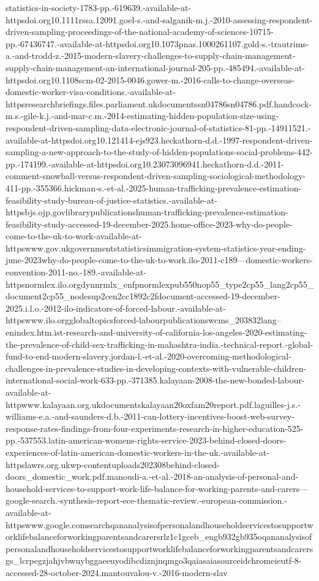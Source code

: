 \documentclass[
  12pt,
  letterpaper,
  DIV=11,
  numbers=noendperiod]{scrartcl}
\begin{document}
{{statistics-in-society-1783-pp.-619639.-available-at-httpsdoi.org10.1111rssa.12091.goel-s.-and-salganik-m.j.-2010-assessing-respondent-driven-sampling-proceedings-of-the-national-academy-of-sciences-10715-pp.-67436747.-available-at-httpsdoi.org10.1073pnas.1000261107.gold-s.-trautrims-a.-and-trodd-z.-2015-modern-slavery-challenges-to-supply-chain-management-supply-chain-management-an-international-journal-205-pp.-485494.-available-at-httpsdoi.org10.1108scm-02-2015-0046.gower-m.-2016-calls-to-change-overseas-domestic-worker-visa-conditions.-available-at-httpsresearchbriefings.files.parliament.ukdocumentssn04786sn04786.pdf.handcock-m.s.-gile-k.j.-and-mar-c.m.-2014-estimating-hidden-population-size-using-respondent-driven-sampling-data-electronic-journal-of-statistics-81-pp.-14911521.-available-at-httpsdoi.org10.121414-ejs923.heckathorn-d.d.-1997-respondent-driven-sampling-a-new-approach-to-the-study-of-hidden-populations-social-problems-442-pp.-174199.-available-at-httpsdoi.org10.23073096941.heckathorn-d.d.-2011-comment-snowball-versus-respondent-driven-sampling-sociological-methodology-411-pp.-355366.hickman-s.-et-al.-2025-human-trafficking-prevalence-estimation-feasibility-study-bureau-of-justice-statistics.-available-at-httpsbjs.ojp.govlibrarypublicationshuman-trafficking-prevalence-estimation-feasibility-study-accessed-19-december-2025.home-office-2023-why-do-people-come-to-the-uk-to-work-available-at-httpswww.gov.ukgovernmentstatisticsimmigration-system-statistics-year-ending-june-2023why-do-people-come-to-the-uk-to-work.ilo-2011-c189---domestic-workers-convention-2011-no.-189.-available-at-httpsnormlex.ilo.orgdynnrmlx_enfpnormlexpub550nop55_type2cp55_lang2cp55_document2cp55_nodesup2cen2cc1892c2fdocument-accessed-19-december-2025.i.l.o.-2012-ilo-indicators-of-forced-labour.-available-at-httpswww.ilo.orgglobaltopicsforced-labourpublicationswcms_203832lang--enindex.htm.ist-research-and-university-of-california-los-angeles-2020-estimating-the-prevalence-of-child-sex-trafficking-in-mahashtra-india.-technical-report.-global-fund-to-end-modern-slavery.jordan-l.-et-al.-2020-overcoming-methodological-challenges-in-prevalence-studies-in-developing-contexts-with-vulnerable-children-international-social-work-633-pp.-371385.kalayaan-2008-the-new-bonded-labour-available-at-httpwww.kalayaan.org.ukdocumentskalayaan20oxfam20report.pdf.laguilles-j.s.-williams-e.a.-and-saunders-d.b.-2011-can-lottery-incentives-boost-web-survey-response-rates-findings-from-four-experiments-research-in-higher-education-525-pp.-537553.latin-american-womens-rights-service-2023-behind-closed-doors-experiences-of-latin-american-domestic-workers-in-the-uk.-available-at-httpslawrs.org.ukwp-contentuploads202308behind-closed-doors_domestic_work.pdf.manoudi-a.-et-al.-2018-an-analysis-of-personal-and-household-services-to-support-work-life-balance-for-working-parents-and-carers---google-search.-synthesis-report-ece-thematic-review.-european-commission.-available-at-httpswww.google.comsearchqananalysisofpersonalandhouseholdservicestosupportworklifebalanceforworkingparentsandcarersrlz1c1gceb_engb932gb935oqananalysisofpersonalandhouseholdservicestosupportworklifebalanceforworkingparentsandcarersgs_lcrpegzjahjvbwuybggaeeuyodibcdiznjnqmgo3qaiasaiasourceidchromeieutf-8-accessed-28-october-2024.mantouvalou-v.-2016-modern-slav}}
\end{document}
